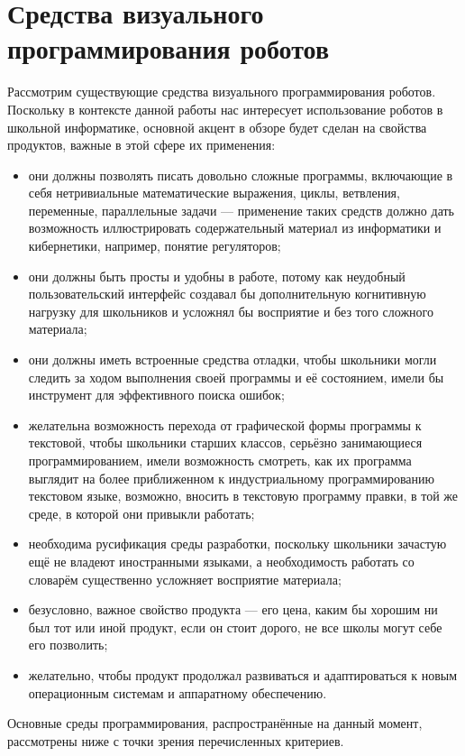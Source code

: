 \documentclass[a4paper]{article}
\begin{document}
\section{Средства визуального программирования роботов}
Рассмотрим существующие средства визуального программирования роботов. Поскольку в контексте данной работы нас интересует использование роботов в школьной информатике, основной акцент в обзоре будет сделан на свойства продуктов, важные в этой сфере их применения:
\begin{itemize}
  \item они должны позволять писать довольно сложные программы, включающие в себя нетривиальные математические выражения, циклы, ветвления, переменные, параллельные задачи --- применение таких средств должно дать возможность иллюстрировать содержательный материал из информатики и кибернетики, например, понятие регуляторов;
  \item они должны быть просты и удобны в работе, потому как неудобный пользовательский интерфейс создавал бы дополнительную когнитивную нагрузку для школьников и усложнял бы восприятие и без того сложного материала;
  \item они должны иметь встроенные средства отладки, чтобы школьники могли следить за ходом выполнения своей программы и её состоянием, имели бы инструмент для эффективного поиска ошибок;
  \item желательна возможность перехода от графической формы программы к текстовой, чтобы школьники старших классов, серьёзно занимающиеся программированием, имели возможность смотреть, как их программа выглядит на более приближенном к индустриальному программированию текстовом языке, возможно, вносить в текстовую программу правки, в той же среде, в которой они привыкли работать;
  \item необходима русификация среды разработки, поскольку школьники зачастую ещё не владеют иностранными языками, а необходимость работать со словарём существенно усложняет восприятие материала;
  \item безусловно, важное свойство продукта --- его цена, каким бы хорошим ни был тот или иной продукт, если он стоит дорого, не все школы могут себе его позволить;
  \item желательно, чтобы продукт продолжал развиваться и адаптироваться к новым операционным системам и аппаратному обеспечению.
\end{itemize}
Основные среды программирования, распространённые на данный момент, рассмотрены ниже с точки зрения перечисленных критериев.
\end{document}
